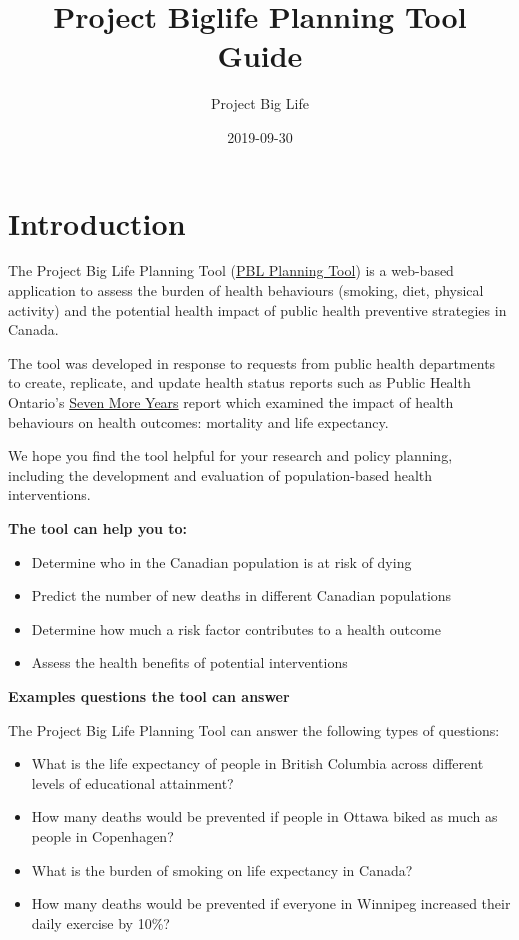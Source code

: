 \documentclass[]{book}
\title{Project Biglife Planning Tool Guide}
\author{Project Big Life}
\date{2019-09-30}
\providecommand{\tightlist}{%
  \setlength{\itemsep}{0pt}\setlength{\parskip}{0pt}}
\begin{document}
\maketitle

{
\setcounter{tocdepth}{1}
\tableofcontents
}
\hypertarget{introduction}{%
\chapter{Introduction}\label{introduction}}

The Project Big Life Planning Tool (\href{http://planning.projectbiglife.ca/}{PBL Planning Tool}) is a web-based application to assess the burden of health behaviours (smoking, diet, physical activity) and the potential health impact of public health preventive strategies in Canada.

The tool was developed in response to requests from public health departments to create, replicate, and update health status reports such as Public Health Ontario's \href{https://www.ices.on.ca/Publications/Atlases-and-Reports/2012/Seven-More-Years}{Seven More Years} report which examined the impact of health behaviours on health outcomes: mortality and life expectancy.

We hope you find the tool helpful for your research and policy planning, including the development and evaluation of population-based health interventions.

\textbf{The tool can help you to:}

\begin{itemize}
\tightlist
\item
  Determine who in the Canadian population is at risk of dying
\item
  Predict the number of new deaths in different Canadian populations
\item
  Determine how much a risk factor contributes to a health outcome
\item
  Assess the health benefits of potential interventions
\end{itemize}

\textbf{Examples questions the tool can answer}

The Project Big Life Planning Tool can answer the following types of questions:

\begin{itemize}
\tightlist
\item
  What is the life expectancy of people in British Columbia across different levels of educational attainment?
\item
  How many deaths would be prevented if people in Ottawa biked as much as people in Copenhagen?
\item
  What is the burden of smoking on life expectancy in Canada?
\item
  How many deaths would be prevented if everyone in Winnipeg increased their daily exercise by 10\%?
\end{itemize}
\end{document}
